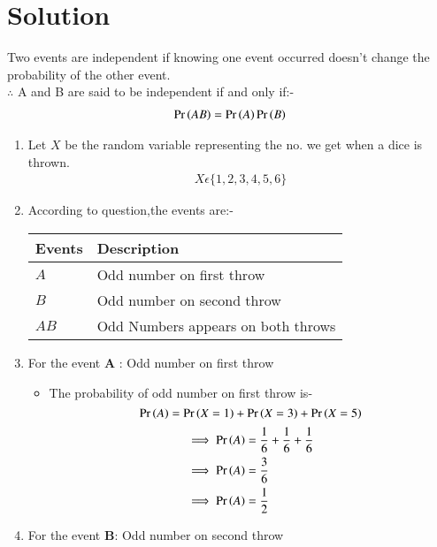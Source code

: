 \documentclass[journal,12pt,twocolumn]{IEEEtran}
\begin{document}
\section{Solution}
\begin{lemma}
Two events are independent if knowing one event occurred doesn't change the probability of the other event.
\\
$\therefore$ A and B are said to be independent if and only if:-
\begin{align}
\Pr\left(AB\right)=\Pr\left(A\right)\Pr\left(B\right)   
\end{align}
\label{lemma1}
\end{lemma} 
\begin{enumerate}
\item Let $X$ be the random variable representing the no. we get  when a dice is thrown.
\begin{align}
    X\epsilon\{1,2,3,4,5,6\}
\end{align}
\item According to question,the events are:-
\begin{table}[ht!]
\begin{tabular}{|l|l|}
\hline
\textbf{Events} & \textbf{Description}                         \\ \hline
$A$ & Odd number on first throw
\\ \hline
$B$ & Odd number on second throw 
\\ \hline
$AB$ & Odd Numbers appears on both throws \\ \hline
\end{tabular}
\end{table}
\item For the event \textbf{A} : Odd number on first throw
\begin{itemize}
    \item The probability of odd number on first throw is-
\begin{equation}
    \Pr\left(A\right)=\Pr\left(X=1\right)+\Pr\left(X=3\right)+\Pr\left(X=5\right)
\end{equation}
\begin{align}
\implies\Pr\left(A\right)&=\frac{1}{6}+\frac{1}{6}+\frac{1}{6}
\\
\implies  \Pr\left(A\right) &= \frac{3}{6} 
\\
\implies \Pr\left(A\right)  &= \frac{1}{2} \label{eqA}
 \end{align}
 \end{itemize}
 \item For the event \textbf{B}: Odd number on second throw
    \begin{itemize}

\end{itemize}
\end{enumerate}
\end{document}
